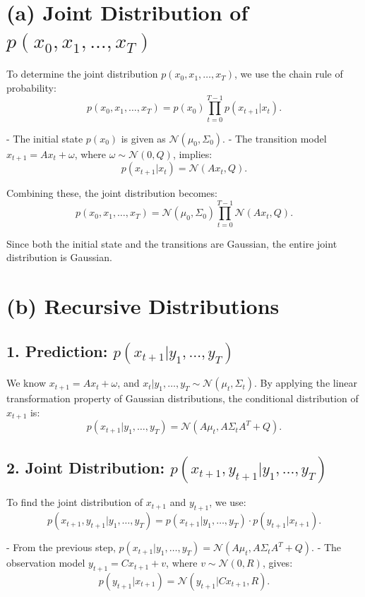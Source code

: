 \documentclass[12pt]{article}
\begin{document}
\section*{(a) Joint Distribution of \( p(x_0, x_1, \dots, x_T) \)}

To determine the joint distribution \( p(x_0, x_1, \dots, x_T) \), we use the chain rule of probability:
\[
p(x_0, x_1, \dots, x_T) = p(x_0) \prod_{t=0}^{T-1} p(x_{t+1} | x_t).
\]

- The initial state \( p(x_0) \) is given as \( \mathcal{N}(\mu_0, \Sigma_0) \).
- The transition model \( x_{t+1} = A x_t + \omega \), where \( \omega \sim \mathcal{N}(0, Q) \), implies:
\[
p(x_{t+1} | x_t) = \mathcal{N}(A x_t, Q).
\]

Combining these, the joint distribution becomes:
\[
p(x_0, x_1, \dots, x_T) = \mathcal{N}(\mu_0, \Sigma_0) \prod_{t=0}^{T-1} \mathcal{N}(A x_t, Q).
\]

Since both the initial state and the transitions are Gaussian, the entire joint distribution is Gaussian.

\section*{(b) Recursive Distributions}

\subsection*{1. Prediction: \( p(x_{t+1} | y_1, \dots, y_T) \)}

We know \( x_{t+1} = A x_t + \omega \), and \( x_t | y_1, \dots, y_T \sim \mathcal{N}(\mu_t, \Sigma_t) \). By applying the linear transformation property of Gaussian distributions, the conditional distribution of \( x_{t+1} \) is:
\[
p(x_{t+1} | y_1, \dots, y_T) = \mathcal{N}(A \mu_t, A \Sigma_t A^T + Q).
\]

\subsection*{2. Joint Distribution: \( p(x_{t+1}, y_{t+1} | y_1, \dots, y_T) \)}

To find the joint distribution of \( x_{t+1} \) and \( y_{t+1} \), we use:
\[
p(x_{t+1}, y_{t+1} | y_1, \dots, y_T) = p(x_{t+1} | y_1, \dots, y_T) \cdot p(y_{t+1} | x_{t+1}).
\]

- From the previous step, \( p(x_{t+1} | y_1, \dots, y_T) = \mathcal{N}(A \mu_t, A \Sigma_t A^T + Q) \).
- The observation model \( y_{t+1} = C x_{t+1} + v \), where \( v \sim \mathcal{N}(0, R) \), gives:
\[
p(y_{t+1} | x_{t+1}) = \mathcal{N}(y_{t+1} | C x_{t+1}, R).
\]
\end{document}
